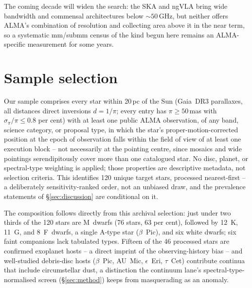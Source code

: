 \documentclass{openjournal}
\begin{document}
The coming decade will widen the search: the SKA
\citep{SKA2015,SKA2026review} and ngVLA \citep{ngVLASETI2022} bring
wide bandwidth and commensal architectures below ${\sim}50$\,GHz, but
neither offers ALMA's combination of resolution and collecting area
above it in the near term, so a systematic mm/submm census of the
kind begun here remains an ALMA-specific measurement for some years.

\section{Sample selection}
\label{sec:sample}

Our sample comprises every star within 20\,pc of the Sun (Gaia~DR3
parallaxes, all distances direct inversions $d = 1/\pi$; every entry
has $\pi \ge 50$\,mas with $\sigma_\pi/\pi \le 0.8$ per cent) with at
least one public ALMA observation, of any band, science category, or
proposal type, in which the star's proper-motion-corrected position at
the epoch of observation falls within the field of view of at least
one execution block -- not necessarily at the pointing centre, since
mosaics and wide pointings serendipitously cover more than one
catalogued star. No disc, planet, or spectral-type weighting is
applied; those properties are descriptive metadata, not selection
criteria. This identifies 120 unique target stars, processed
nearest-first -- a deliberately sensitivity-ranked order, not an
unbiased draw, and the prevalence statements of
\S\ref{sec:discussion} are conditional on it.

The composition follows directly from this archival selection: just
under two thirds of the 120 stars are M~dwarfs (76 stars, 63 per
cent), followed by 12~K, 11~G, and 8~F~dwarfs, a single A-type star
($\beta$~Pic), and six white dwarfs; six faint companions lack
tabulated types. Fifteen of the 46 processed stars are confirmed
exoplanet hosts -- a direct imprint of the observing-history bias --
and well-studied debris-disc hosts ($\beta$~Pic, AU~Mic,
$\epsilon$~Eri, $\tau$~Cet) contribute continua that include
circumstellar dust, a distinction the continuum lane's
spectral-type-normalised screen (\S\ref{sec:method}) keeps from
masquerading as an anomaly.
\end{document}
